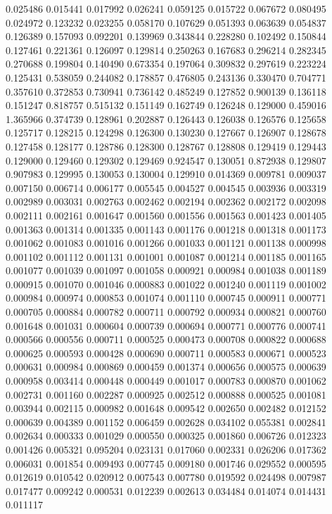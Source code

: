 0.025486
0.015441
0.017992
0.026241
0.059125
0.015722
0.067672
0.080495
0.024972
0.123232
0.023255
0.058170
0.107629
0.051393
0.063639
0.054837
0.126389
0.157093
0.092201
0.139969
0.343844
0.228280
0.102492
0.150844
0.127461
0.221361
0.126097
0.129814
0.250263
0.167683
0.296214
0.282345
0.270688
0.199804
0.140490
0.673354
0.197064
0.309832
0.297619
0.223224
0.125431
0.538059
0.244082
0.178857
0.476805
0.243136
0.330470
0.704771
0.357610
0.372853
0.730941
0.736142
0.485249
0.127852
0.900139
0.136118
0.151247
0.818757
0.515132
0.151149
0.162749
0.126248
0.129000
0.459016
1.365966
0.374739
0.128961
0.202887
0.126443
0.126038
0.126576
0.125658
0.125717
0.128215
0.124298
0.126300
0.130230
0.127667
0.126907
0.128678
0.127458
0.128177
0.128786
0.128300
0.128767
0.128808
0.129419
0.129443
0.129000
0.129460
0.129302
0.129469
0.924547
0.130051
0.872938
0.129807
0.907983
0.129995
0.130053
0.130004
0.129910
0.014369
0.009781
0.009037
0.007150
0.006714
0.006177
0.005545
0.004527
0.004545
0.003936
0.003319
0.002989
0.003031
0.002763
0.002462
0.002194
0.002362
0.002172
0.002098
0.002111
0.002161
0.001647
0.001560
0.001556
0.001563
0.001423
0.001405
0.001363
0.001314
0.001335
0.001143
0.001176
0.001218
0.001318
0.001173
0.001062
0.001083
0.001016
0.001266
0.001033
0.001121
0.001138
0.000998
0.001102
0.001112
0.001131
0.001001
0.001087
0.001214
0.001185
0.001165
0.001077
0.001039
0.001097
0.001058
0.000921
0.000984
0.001038
0.001189
0.000915
0.001070
0.001046
0.000883
0.001022
0.001240
0.001119
0.001002
0.000984
0.000974
0.000853
0.001074
0.001110
0.000745
0.000911
0.000771
0.000705
0.000884
0.000782
0.000711
0.000792
0.000934
0.000821
0.000760
0.001648
0.001031
0.000604
0.000739
0.000694
0.000771
0.000776
0.000741
0.000566
0.000556
0.000711
0.000525
0.000473
0.000708
0.000822
0.000688
0.000625
0.000593
0.000428
0.000690
0.000711
0.000583
0.000671
0.000523
0.000631
0.000984
0.000869
0.000459
0.001374
0.000656
0.000575
0.000639
0.000958
0.003414
0.000448
0.000449
0.001017
0.000783
0.000870
0.001062
0.002731
0.001160
0.002287
0.000925
0.002512
0.000888
0.000525
0.001081
0.003944
0.002115
0.000982
0.001648
0.009542
0.002650
0.002482
0.012152
0.000639
0.004389
0.001152
0.006459
0.002628
0.034102
0.055381
0.002841
0.002634
0.000333
0.001029
0.000550
0.000325
0.001860
0.006726
0.012323
0.001426
0.005321
0.095204
0.023131
0.017060
0.002331
0.026206
0.017362
0.006031
0.001854
0.009493
0.007745
0.009180
0.001746
0.029552
0.000595
0.012619
0.010542
0.020912
0.007543
0.007780
0.019592
0.024498
0.007987
0.017477
0.009242
0.000531
0.012239
0.002613
0.034484
0.014074
0.014431
0.011117
